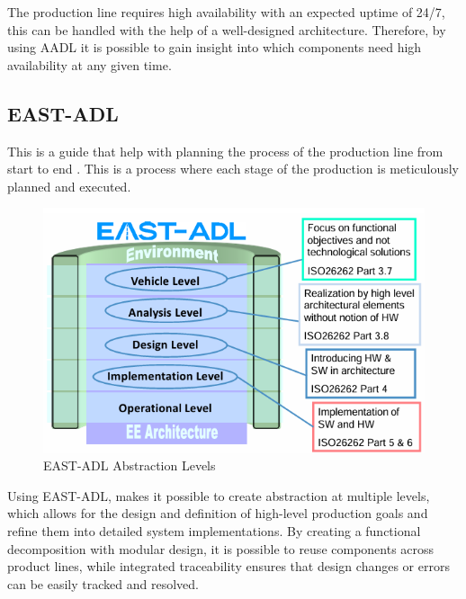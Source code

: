 
The production line requires high availability with an expected uptime of 24/7, this can be handled with the help of a well-designed architecture. Therefore, by using AADL it is possible to gain insight into which components need high availability at any given time.


\subsection{EAST-ADL}
This is a guide that help with planning the process of the production line from start to end \cite{eastadl_whitepaper}. This is a process where each stage of the production is meticulously planned and executed.

\begin{figure}[hbt]
    \centering
    \caption{EAST-ADL Abstraction Levels}
    \label{fig:east-adl-levels}
    \includegraphics[width=1\linewidth]{images/EAST-ADL abstraction levels.png}
\end{figure}

Using EAST-ADL, makes it possible to create abstraction at multiple levels, which allows for the design and definition of high-level production goals and refine them into detailed system implementations. By creating a functional decomposition with modular design, it is possible to reuse components across product lines, while integrated traceability ensures that design changes or errors can be easily tracked and resolved.

